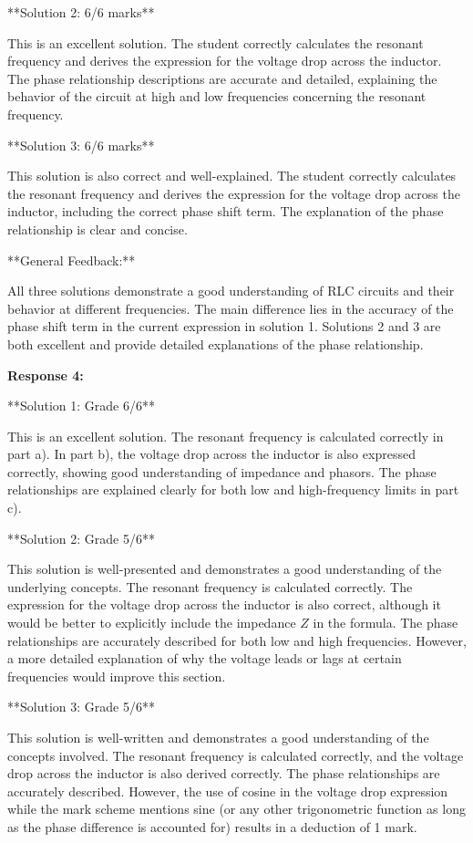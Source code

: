 \documentclass[a4paper,11pt]{article}
\begin{document}
**Solution 2: 6/6 marks**

This is an excellent solution. The student correctly calculates the resonant frequency and derives the expression for the voltage drop across the inductor. The phase relationship descriptions are accurate and detailed, explaining the behavior of the circuit at high and low frequencies concerning the resonant frequency.

**Solution 3: 6/6 marks**

This solution is also correct and well-explained. The student correctly calculates the resonant frequency and derives the expression for the voltage drop across the inductor, including the correct phase shift term. The explanation of the phase relationship is clear and concise.

**General Feedback:**

All three solutions demonstrate a good understanding of RLC circuits and their behavior at different frequencies. The main difference lies in the accuracy of the phase shift term in the current expression in solution 1. Solutions 2 and 3 are both excellent and provide detailed explanations of the phase relationship.

\textbf{Response 4:}

**Solution 1: Grade 6/6**

This is an excellent solution. The resonant frequency is calculated correctly in part a). In part b), the voltage drop across the inductor is also expressed correctly, showing good understanding of impedance and phasors. The phase relationships are explained clearly for both low and high-frequency limits in part c).

**Solution 2: Grade 5/6**

This solution is well-presented and demonstrates a good understanding of the underlying concepts. The resonant frequency is calculated correctly. The expression for the voltage drop across the inductor is also correct, although it would be better to explicitly include the impedance \(Z\) in the formula. The phase relationships are accurately described for both low and high frequencies. However, a more detailed explanation of why the voltage leads or lags at certain frequencies would improve this section.

**Solution 3: Grade 5/6**

This solution is well-written and demonstrates a good understanding of the concepts involved. The resonant frequency is calculated correctly, and the voltage drop across the inductor is also derived correctly. The phase relationships are accurately described. However, the use of cosine in the voltage drop expression while the mark scheme mentions sine (or any other trigonometric function as long as the phase difference is accounted for) results in a deduction of 1 mark.
\end{document}
